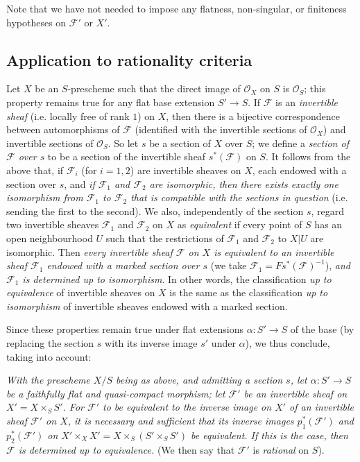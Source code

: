 Note that we have not needed to impose any flatness, non-singular, or finiteness hypotheses on $\mathcal{F}'$ or $X'$.


\subsection{Application to rationality criteria}\label{fga3.i-b.4}

Let $X$ be an $S$-prescheme such that the direct image of $\mathcal{O}_X$ on $S$ is $\mathcal{O}_S$;
this property remains true for any flat base extension $S'\to S$.
If $\mathcal{F}$ is an \emph{invertible sheaf} (i.e. locally free of rank $1$) on $X$, then there is a bijective correspondence between automorphisms of $\mathcal{F}$ (identified with the invertible sections of $\mathcal{O}_X$) and invertible sections of $\mathcal{O}_S$.
So let $s$ be a section of $X$ over $S$;
we define a \emph{section of $\mathcal{F}$ over $s$} to be a section of the invertible sheaf $s^*(\mathcal{F})$ on $S$.
It follows from the above that, if $\mathcal{F}_i$ (for $i=1,2$) are invertible sheaves on $X$, each endowed with a section over $s$, and \emph{if $\mathcal{F}_1$ and $\mathcal{F}_2$ are isomorphic, then there exists exactly one isomorphism from $\mathcal{F}_1$ to $\mathcal{F}_2$ that is compatible with the sections in question} (i.e. sending the first to the second).
We also, independently of the section $s$, regard two invertible sheaves $\mathcal{F}_1$ and $\mathcal{F}_2$ on $X$ as \emph{equivalent} if every point of $S$ has an open neighbourhood $U$ such that the restrictions of $\mathcal{F}_1$ and $\mathcal{F}_2$ to $X|U$ are isomorphic.
Then \emph{every invertible sheaf $\mathcal{F}$ on $X$ is equivalent to an invertible sheaf $\mathcal{F}_1$ endowed with a marked section over $s$} (we take $\mathcal{F}_1=Fs^*(\mathcal{F})^{-1}$), \emph{and $\mathcal{F}_1$ is determined up to isomorphism}.
In other words, the classification \emph{up to equivalence} of invertible sheaves on $X$ is the same as the classification \emph{up to isomorphism} of invertible sheaves endowed with a marked section.

Since these properties remain true under flat extensions $\alpha\colon S'\to S$ of the base (by replacing the section $s$ with its inverse image $s'$ under $\alpha$), we thus conclude, taking  into account:

\emph{
    With the prescheme $X/S$ being as above, and admitting a section $s$, let $\alpha\colon S'\to S$ be a faithfully flat and quasi-compact morphism; let $\mathcal{F}'$ be an invertible sheaf on $X'=X\times_S S'$.
    For $\mathcal{F}'$ to be equivalent to the inverse image on $X'$ of an invertible sheaf $\mathcal{F}'$ on $X$, it is necessary and sufficient that its inverse images $p_1^*(\mathcal{F}')$ and $p_2^*(\mathcal{F}')$ on $X'\times_X X'=X\times_S(S'\times_S S')$ be equivalent.
    If this is the case, then $\mathcal{F}$ is determined up to equivalence.
}
(We then say that $\mathcal{F}'$ is \emph{rational} on $S$).

